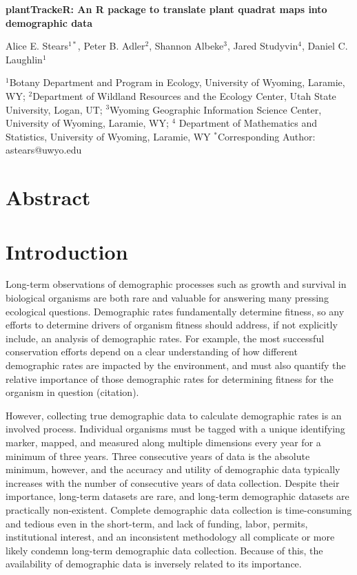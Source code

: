 \documentclass[12pt, letterpaper]{article}
\begin{document}
\begin{flushleft}
\Large{\textbf{plantTrackeR: An R package to translate plant quadrat maps into demographic data}} 

\normalsize{Alice E. Stears$^{1*}$, Peter B. Adler$^2$, Shannon Albeke$^{3}$, Jared Studyvin$^{4}
$, Daniel C. Laughlin$^1$}

\small{$^1$Botany Department and Program in Ecology, University of Wyoming, Laramie, WY; \linebreak
$^2$Department of Wildland Resources and the Ecology Center, Utah State University, Logan, UT; \linebreak
$^3$Wyoming Geographic Information Science Center, University of Wyoming,
Laramie, WY; \linebreak
$^4$ Department of Mathematics and Statistics, University of Wyoming, Laramie, WY \linebreak 
}
\small{$^*$Corresponding Author: astears@uwyo.edu}

\end{flushleft}

\section{Abstract}
\section{Introduction}
Long-term observations of demographic processes such as growth and survival in biological organisms are both rare and valuable for answering many pressing ecological questions. Demographic rates fundamentally determine fitness, so any efforts to determine drivers of organism fitness should address, if not explicitly include, an analysis of demographic rates. For example, the most successful conservation efforts depend on a clear understanding of how different demographic rates are impacted by the environment, and must also quantify the relative importance of those demographic rates for determining fitness for the organism in question (citation). 

However, collecting true demographic data to calculate demographic rates is an involved process. Individual organisms must be tagged with a unique identifying marker, mapped, and measured along multiple dimensions every year for a minimum of three years. Three consecutive years of data is the absolute minimum, however, and the accuracy and utility of demographic data typically increases with the number of consecutive years of data collection. Despite their importance, long-term datasets are rare, and long-term demographic datasets are practically non-existent. Complete demographic data collection is time-consuming and tedious even in the short-term, and lack of funding, labor, permits, institutional interest, and an inconsistent methodology all complicate or more likely condemn long-term demographic data collection. Because of this, the availability of demographic data is inversely related to its importance.  
\end{document}
